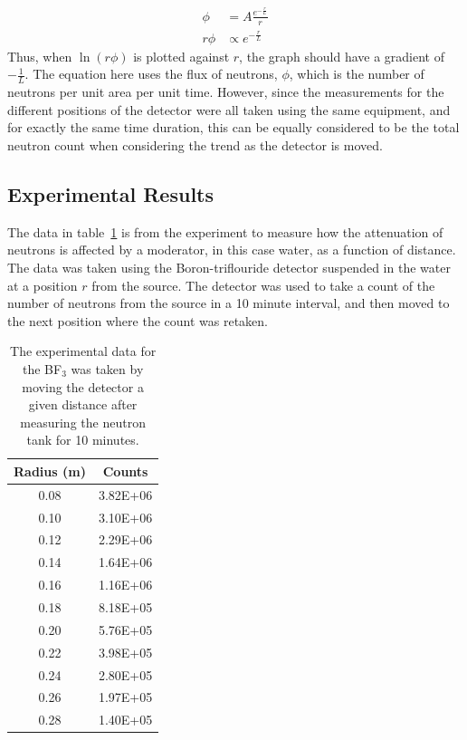 \begin{align}
  \phi &= A\frac{e^{-\frac{r}{L}}}{r} \\
  r\phi &\propto e^{-\frac{r}{L}}
\end{align}
Thus, when $\ln(r\phi)$ is plotted against $r$, the graph should have a gradient of $-\frac{1}{L}$\cite{krane}. The equation here uses the flux of neutrons, $\phi$, which is the number of neutrons per unit area per unit time. However, since the measurements for the different positions of the detector were all taken using the same equipment, and for exactly the same time duration, this can be equally considered to be the total neutron count when considering the trend as the detector is moved.

\subsection{Experimental Results} %
\label{sub:bf3experimental_results}
The data in table~\ref{tab:bf3results} is from the experiment to measure how the attenuation of neutrons is affected by a moderator, in this case water, as a function of distance. The data was taken using the Boron-triflouride detector suspended in the water at a position $r$ from the source. The detector was used to take a count of the number of neutrons from the source in a 10 minute interval, and then moved to the next position where the count was retaken.
\begin{table}[ht]
  \centering
  \begin{tabular}{c|c}
  Radius (m)  &   Counts   \\
  \hline\hline
  0.08        &   3.82E+06 \\
  0.10        &   3.10E+06 \\
  0.12        &   2.29E+06 \\
  0.14        &   1.64E+06 \\
  0.16        &   1.16E+06 \\
  0.18        &   8.18E+05 \\
  0.20        &   5.76E+05 \\
  0.22        &   3.98E+05 \\
  0.24        &   2.80E+05 \\
  0.26        &   1.97E+05 \\
  0.28        &   1.40E+05 \\  
  \end{tabular}
  \caption{The experimental data for the BF$_3$ was taken by moving the detector a given distance after measuring the neutron tank for 10 minutes.\label{tab:bf3results}}
\end{table}

